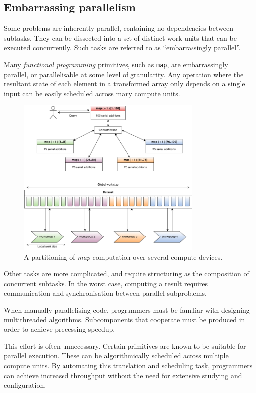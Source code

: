 \subsection{Embarrassing parallelism}
Some problems are inherently parallel, containing no dependencies between subtasks. They can be dissected into a set of distinct work-units that can be executed concurrently.
Such tasks are referred to as ``embarrassingly parallel''.

Many \emph{functional programming} primitives, such as \verb|map|, are embarrassingly parallel, or parallelisable at some level of granularity.
Any operation where the resultant state of each element in a transformed array only depends on a single input can be easily scheduled across many compute units.

\begin{figure}[h]
  \includegraphics[width=0.8\textwidth]{./figures/map_task.png}
  \caption{A partitioning of \emph{map} computation over several compute devices.}
  \label{fig:map_task}
\end{figure}

Other tasks are more complicated, and require structuring as the composition of concurrent subtasks.
In the worst case, computing a result requires communication and synchronisation between parallel subproblems.

When manually parallelising code, programmers must be familiar with designing multithreaded algorithms. Subcomponents that cooperate must be produced in order to achieve processing speedup.

This effort is often unnecessary. Certain primitives are known to be suitable for parallel execution. These can be algorithmically scheduled across multiple compute units. By automating this translation and scheduling task, programmers can achieve increased throughput without the need for extensive studying and configuration.

